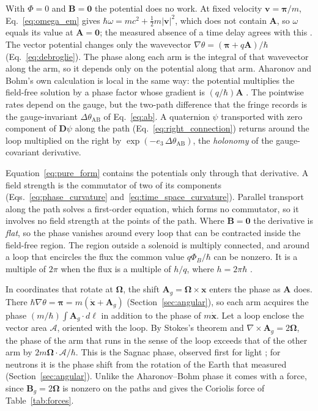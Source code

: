 \documentclass[aps,prd,onecolumn,tightenlines,nofootinbib,notitlepage,11pt,floatfix]{revtex4-2}
\theoremstyle{indentedtheorem}
\begin{document}
With $\Phi=0$ and $\mathbf{B}=\mathbf{0}$ the potential does no work. At fixed velocity $\mathbf{v}=\boldsymbol{\pi}/m$, Eq.~\eqref{eq:omega_em} gives $\hbar\omega=mc^2+\tfrac{1}{2}m|\mathbf{v}|^2$, which does not contain $\mathbf{A}$, so $\omega$ equals its value at $\mathbf{A}=\mathbf{0}$; the measured absence of a time delay agrees with this \citep{Caprez2007Macroscopic}. The vector potential changes only the wavevector $\nabla\theta=(\boldsymbol{\pi}+q\mathbf{A})/\hbar$ (Eq.~\eqref{eq:debroglie}). The phase along each arm is the integral of that wavevector along the arm, so it depends only on the potential along that arm. Aharonov and Bohm's own calculation is local in the same way: the potential multiplies the field-free solution by a phase factor whose gradient is $(q/\hbar)\mathbf{A}$ \citep{Aharonov1959Significance}. The pointwise rates depend on the gauge, but the two-path difference that the fringe records is the gauge-invariant $\Delta\theta_\text{AB}$ of Eq.~\eqref{eq:ab}. A quaternion $\psi$ transported with zero component of $\mathbf{D}\psi$ along the path (Eq.~\eqref{eq:right_connection}) returns around the loop multiplied on the right by $\exp(-e_3\,\Delta\theta_\text{AB})$, the \emph{holonomy} of the gauge-covariant derivative.

Equation~\eqref{eq:pure_form} contains the potentials only through that derivative. A field strength is the commutator of two of its components (Eqs.~\eqref{eq:phase_curvature} and~\eqref{eq:time_space_curvature}). Parallel transport along the path solves a first-order equation, which forms no commutator, so it involves no field strength at the points of the path. Where $\mathbf{B}=\mathbf{0}$ the derivative is \emph{flat}, so the phase vanishes around every loop that can be contracted inside the field-free region. The region outside a solenoid is multiply connected, and around a loop that encircles the flux the common value $q\Phi_B/\hbar$ can be nonzero. It is a multiple of $2\pi$ when the flux is a multiple of $h/q$, where $h=2\pi\hbar$ \citep{Aharonov1959Significance}.

In coordinates that rotate at $\boldsymbol{\Omega}$, the shift $\mathbf{A}_g=\boldsymbol{\Omega}\times\mathbf{x}$ enters the phase as $\mathbf{A}$ does. There $\hbar\nabla\theta=\boldsymbol{\pi}=m(\dot{\mathbf{x}}+\mathbf{A}_g)$ (Section~\ref{sec:angular}), so each arm acquires the phase $(m/\hbar)\int\mathbf{A}_g\cdot d\boldsymbol{\ell}$ in addition to the phase of $m\dot{\mathbf{x}}$. Let a loop enclose the vector area $\boldsymbol{\mathcal{A}}$, oriented with the loop. By Stokes's theorem and $\nabla\times\mathbf{A}_g=2\boldsymbol{\Omega}$, the phase of the arm that runs in the sense of the loop exceeds that of the other arm by $2m\boldsymbol{\Omega}\cdot\boldsymbol{\mathcal{A}}/\hbar$. This is the Sagnac phase, observed first for light \citep{Sagnac1913Effect}; for neutrons it is the phase shift from the rotation of the Earth that \citet{Werner1979Effect} measured (Section~\ref{sec:angular}). Unlike the Aharonov--Bohm phase it comes with a force, since $\mathbf{B}_g=2\boldsymbol{\Omega}$ is nonzero on the paths and gives the Coriolis force of Table~\ref{tab:forces}.
\end{document}
